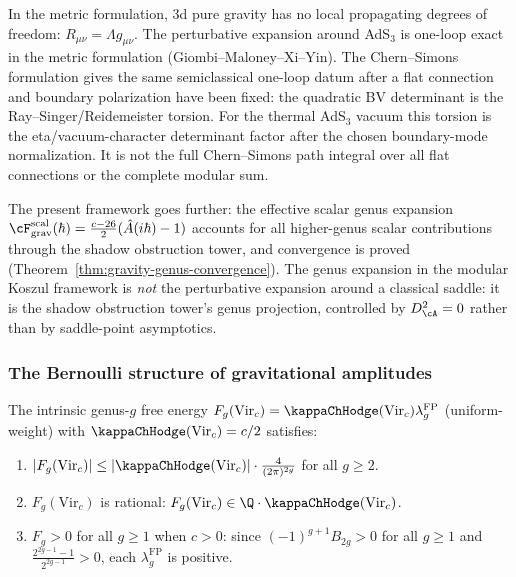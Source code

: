In the metric formulation, 3d pure gravity has no local propagating
degrees of freedom: $R_{\mu\nu} = \Lambda g_{\mu\nu}$. The
perturbative expansion around AdS$_3$ is one-loop exact in the
metric formulation (Giombi--Maloney--Xi--Yin). The Chern--Simons
formulation gives the same semiclassical one-loop datum after a flat
connection and boundary polarization have been fixed: the quadratic
BV determinant is the Ray--Singer/Reidemeister torsion. For the
thermal AdS$_3$ vacuum this torsion is the eta/vacuum-character
determinant factor after the chosen boundary-mode normalization. It is
not the full Chern--Simons path integral over all flat connections or
the complete modular sum.

The present framework goes further: the effective scalar genus
expansion
$\cF_{\mathrm{grav}}^{\mathrm{scal}}(\hbar)
= \frac{c-26}{2}(\hat A(i\hbar) - 1)$ accounts for all
higher-genus scalar contributions through the shadow obstruction tower, and
convergence is proved (Theorem~\ref{thm:gravity-genus-convergence}).
The genus expansion in the modular Koszul framework
is \emph{not} the perturbative expansion around a classical saddle:
it is the shadow obstruction tower's genus projection, controlled by $D_\cA^2 = 0$ rather than by
saddle-point asymptotics.

\subsubsection*{The Bernoulli structure of gravitational amplitudes}

\begin{proposition}
\label{prop:gravity-bernoulli-control}
The intrinsic genus-$g$ free energy
$F_g(\mathrm{Vir}_c)=\kappaChHodge(\mathrm{Vir}_c)\lambda_g^{\mathrm{FP}}$
\textup{(}uniform-weight\textup{)}
with $\kappaChHodge(\mathrm{Vir}_c)=c/2$ satisfies:
\begin{enumerate}[label=\textup{(\roman*)}]
\item $|F_g(\mathrm{Vir}_c)| \le |\kappaChHodge(\mathrm{Vir}_c)| \cdot
 \frac{4}{(2\pi)^{2g}}$ for all $g \ge 2$.
\item $F_g(\mathrm{Vir}_c)$ is rational:
 \(F_g(\mathrm{Vir}_c) \in
 \Q \cdot \kappaChHodge(\mathrm{Vir}_c)\).
\item $F_g > 0$ for all $g \ge 1$ when $c > 0$:
 since $(-1)^{g+1}B_{2g} > 0$ for all $g \ge 1$
 and $\frac{2^{2g-1}-1}{2^{2g-1}} > 0$, each
 $\lambda_g^{\mathrm{FP}}$ is positive.
\end{enumerate}
\end{proposition}

